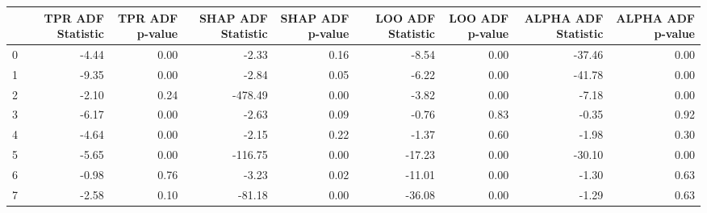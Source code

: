 \begin{tabular}{lrrrrrrrr}
\toprule
 & TPR ADF Statistic & TPR ADF p-value & SHAP ADF Statistic & SHAP ADF p-value & LOO ADF Statistic & LOO ADF p-value & ALPHA ADF Statistic & ALPHA ADF p-value \\
\midrule
0 & -4.44 & 0.00 & -2.33 & 0.16 & -8.54 & 0.00 & -37.46 & 0.00 \\
1 & -9.35 & 0.00 & -2.84 & 0.05 & -6.22 & 0.00 & -41.78 & 0.00 \\
2 & -2.10 & 0.24 & -478.49 & 0.00 & -3.82 & 0.00 & -7.18 & 0.00 \\
3 & -6.17 & 0.00 & -2.63 & 0.09 & -0.76 & 0.83 & -0.35 & 0.92 \\
4 & -4.64 & 0.00 & -2.15 & 0.22 & -1.37 & 0.60 & -1.98 & 0.30 \\
5 & -5.65 & 0.00 & -116.75 & 0.00 & -17.23 & 0.00 & -30.10 & 0.00 \\
6 & -0.98 & 0.76 & -3.23 & 0.02 & -11.01 & 0.00 & -1.30 & 0.63 \\
7 & -2.58 & 0.10 & -81.18 & 0.00 & -36.08 & 0.00 & -1.29 & 0.63 \\
\bottomrule
\end{tabular}
